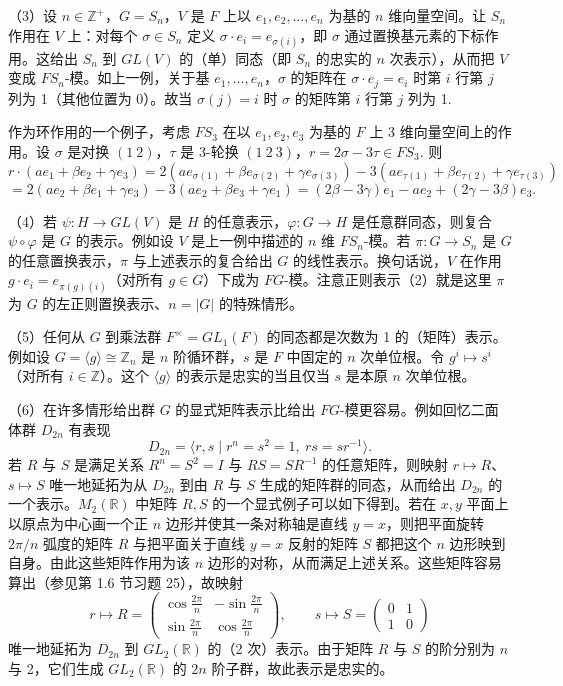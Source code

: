 （3）设 \(n \in \mathbb{Z}^+\)，\(G = S_n\)，\(V\) 是 \(F\) 上以 \(e_1, e_2, \ldots, e_n\) 为基的 \(n\) 维向量空间。让 \(S_n\) 作用在 \(V\) 上：对每个 \(\sigma \in S_n\) 定义 \(\sigma \cdot e_i = e_{\sigma(i)}\)，即 \(\sigma\) 通过置换基元素的下标作用。这给出 \(S_n\) 到 \(GL(V)\) 的（单）同态（即 \(S_n\) 的忠实的 \(n\) 次表示），从而把 \(V\) 变成 \(FS_n\)-模。如上一例，关于基 \(e_1, \ldots, e_n\)，\(\sigma\) 的矩阵在 \(\sigma \cdot e_j = e_i\) 时第 \(i\) 行第 \(j\) 列为 1（其他位置为 0）。故当 \(\sigma(j) = i\) 时 \(\sigma\) 的矩阵第 \(i\) 行第 \(j\) 列为 1.

作为环作用的一个例子，考虑 \(FS_3\) 在以 \(e_1, e_2, e_3\) 为基的 \(F\) 上 3 维向量空间上的作用。设 \(\sigma\) 是对换 \((1\ 2)\)，\(\tau\) 是 3-轮换 \((1\ 2\ 3)\)，\(r = 2\sigma-3\tau \in FS_3\). 则
\[
r \cdot (ae_1+\beta e_2+\gamma e_3) = 2(ae_{\sigma(1)}+\beta e_{\sigma(2)}+\gamma e_{\sigma(3)})-3(ae_{\tau(1)}+\beta e_{\tau(2)}+\gamma e_{\tau(3)})
\]
\[
= 2(ae_2+\beta e_1+\gamma e_3)-3(ae_2+\beta e_3+\gamma e_1) = (2\beta-3\gamma)e_1-ae_2+(2\gamma-3\beta)e_3.
\]

（4）若 \(\psi : H \to GL(V)\) 是 \(H\) 的任意表示，\(\varphi : G \to H\) 是任意群同态，则复合 \(\psi \circ \varphi\) 是 \(G\) 的表示。例如设 \(V\) 是上一例中描述的 \(n\) 维 \(FS_n\)-模。若 \(\pi : G \to S_n\) 是 \(G\) 的任意置换表示，\(\pi\) 与上述表示的复合给出 \(G\) 的线性表示。换句话说，\(V\) 在作用 \(g \cdot e_i = e_{\pi(g)(i)}\)（对所有 \(g \in G\)）下成为 \(FG\)-模。注意正则表示（2）就是这里 \(\pi\) 为 \(G\) 的左正则置换表示、\(n = |G|\) 的特殊情形。

（5）任何从 \(G\) 到乘法群 \(F^\times = GL_1(F)\) 的同态都是次数为 1 的（矩阵）表示。例如设 \(G = \langle g\rangle \cong \mathbb{Z}_n\) 是 \(n\) 阶循环群，\(s\) 是 \(F\) 中固定的 \(n\) 次单位根。令 \(g^i \mapsto s^i\)（对所有 \(i \in \mathbb{Z}\)）。这个 \(\langle g\rangle\) 的表示是忠实的当且仅当 \(s\) 是本原 \(n\) 次单位根。

（6）在许多情形给出群 \(G\) 的显式矩阵表示比给出 \(FG\)-模更容易。例如回忆二面体群 \(D_{2n}\) 有表现
\[
D_{2n} = \langle r, s \mid r^n = s^2 = 1,\ rs = sr^{-1}\rangle.
\]
若 \(R\) 与 \(S\) 是满足关系 \(R^n = S^2 = I\) 与 \(RS = SR^{-1}\) 的任意矩阵，则映射 \(r \mapsto R\)、\(s \mapsto S\) 唯一地延拓为从 \(D_{2n}\) 到由 \(R\) 与 \(S\) 生成的矩阵群的同态，从而给出 \(D_{2n}\) 的一个表示。\(M_2(\mathbb{R})\) 中矩阵 \(R, S\) 的一个显式例子可以如下得到。若在 \(x,y\) 平面上以原点为中心画一个正 \(n\) 边形并使其一条对称轴是直线 \(y = x\)，则把平面旋转 \(2\pi/n\) 弧度的矩阵 \(R\) 与把平面关于直线 \(y = x\) 反射的矩阵 \(S\) 都把这个 \(n\) 边形映到自身。由此这些矩阵作用为该 \(n\) 边形的对称，从而满足上述关系。这些矩阵容易算出（参见第 1.6 节习题 25），故映射
\[
r \mapsto R = \begin{pmatrix}\cos\frac{2\pi}{n} & -\sin\frac{2\pi}{n}\\ \sin\frac{2\pi}{n} & \cos\frac{2\pi}{n}\end{pmatrix}, \qquad s \mapsto S = \begin{pmatrix}0 & 1\\ 1 & 0\end{pmatrix}
\]
唯一地延拓为 \(D_{2n}\) 到 \(GL_2(\mathbb{R})\) 的（2 次）表示。由于矩阵 \(R\) 与 \(S\) 的阶分别为 \(n\) 与 2，它们生成 \(GL_2(\mathbb{R})\) 的 \(2n\) 阶子群，故此表示是忠实的。

